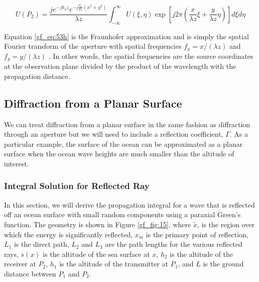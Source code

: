 \begin{equation}
\boxed{U(P_2) =\frac{je^{-jk_oz}e^{-j\frac{k_o}{2z}(x^2+y^2)}}{\lambda z}\int_{-\infty}^{\infty} U(\xi,\eta)\exp\left[j2\pi\left(\frac{x}{\lambda z}\xi + \frac{y}{\lambda z}\eta \right) \right]d\xi d\eta}
\label{gf_eq:53h}
\end{equation}
\renewcommand{\baselinestretch}{2} \small\normalsize

Equation \ref{gf_eq:53h} is the Fraunhofer approximation and is simply the spatial Fourier transform of the aperture with spatial frequencies $f_x = x/(\lambda z)$ and $f_y = y/(\lambda z)$ \cite{goodman_fourier} \cite{gaskill_fourier}. In other words, the spatial frequencies are the source coordinates at the observation plane divided by the product of the wavelength with the propagation distance.

\subsection {Diffraction from a Planar Surface}
We can treat diffraction from a planar surface in the same fashion as diffraction through an aperture but we will need to include a reflection coefficient, $\Gamma$. As a particular example, the surface of the ocean can be approximated as a planar surface when the ocean wave heights are much smaller than the altitude of interest.

\subsubsection{Integral Solution for Reflected Ray}
In this section, we will derive the propagation integral for a wave that is reflected off an ocean surface with small random components using a paraxial Green's function. The geometry is shown in Figure \ref{gf_fig:15}, where $\tilde{x}$, is the region over which the energy is significantly reflected, $x_m$ is the primary point of reflection, $L_1$ is the direct path, $L_2$ and $L_3$ are the path lengths for the various reflected rays, $s(x)$ is the altitude of the sea surface at $x$, $h_2$ is the altitude of the receiver at $P_2$, $h_1$ is the altitude of the transmitter at $P_1$, and $L$ is the ground distance between $P_1$ and $P_2$. 

